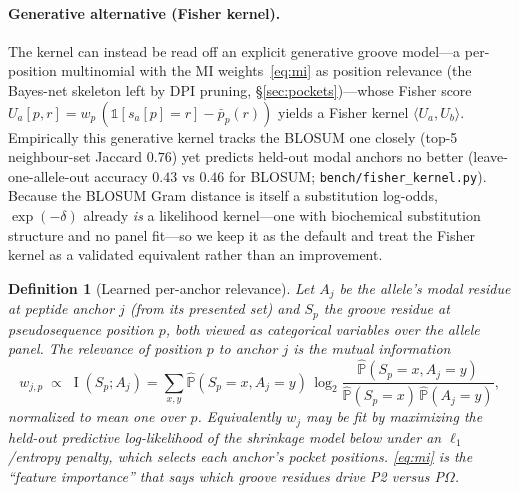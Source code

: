 \documentclass[11pt]{article}
\theoremstyle{oldplain}
\theoremstyle{oldrem}
\newtheorem{definition}{Definition}
\DeclareMathOperator{\MI}{I}
\newcommand{\Prob}{\mathbb{P}}
\newcommand{\one}{\mathds{1}}
\begin{document}
\paragraph{Generative alternative (Fisher kernel).} The kernel can instead be read off an explicit
generative groove model---a per-position multinomial with the MI weights~\eqref{eq:mi} as position
relevance (the Bayes-net skeleton left by DPI pruning, \S\ref{sec:pockets})---whose Fisher score
$U_a[p,r]=w_p\,(\one[s_a[p]{=}r]-\bar p_p(r))$ yields a Fisher kernel $\langle U_a,U_b\rangle$.
Empirically this generative kernel tracks the BLOSUM one closely (top-5 neighbour-set Jaccard
$0.76$) yet predicts held-out modal anchors no better (leave-one-allele-out accuracy $0.43$ vs $0.46$
for BLOSUM; \texttt{bench/fisher\_kernel.py}). Because the BLOSUM Gram distance is itself a
substitution log-odds, $\exp(-\delta)$ already \emph{is} a likelihood kernel---one with biochemical
substitution structure and no panel fit---so we keep it as the default and treat the Fisher kernel as
a validated equivalent rather than an improvement.

\begin{definition}[Learned per-anchor relevance]\label{def:weights}
Let $A_j$ be the allele's modal residue at peptide anchor $j$ (from its presented set) and $S_p$ the
groove residue at pseudosequence position $p$, both viewed as categorical variables over the allele
panel. The relevance of position $p$ to anchor $j$ is the mutual information
\begin{equation}\label{eq:mi}
  w_{j,p}\;\propto\;\MI(S_p;A_j)=\sum_{x,y}\hat{\Prob}(S_p{=}x,A_j{=}y)\,
  \log_2\frac{\hat{\Prob}(S_p{=}x,A_j{=}y)}{\hat{\Prob}(S_p{=}x)\,\hat{\Prob}(A_j{=}y)},
\end{equation}
normalized to mean one over $p$. Equivalently $w_j$ may be fit by maximizing the held-out predictive
log-likelihood of the shrinkage model below under an $\ell_1$/entropy penalty, which selects each
anchor's pocket positions. \eqref{eq:mi} is the ``feature importance'' that says which groove
residues drive P2 versus P$\Omega$.
\end{definition}
\end{document}
